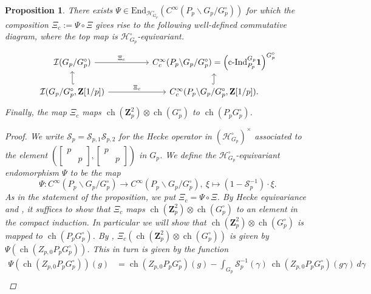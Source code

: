 \documentclass{amsart}%
\theoremstyle{plain}
\newtheorem{prop}[thm]{Proposition}
\theoremstyle{plain}
\theoremstyle{remark}
\DeclareMathOperator{\ch}{ch}
\begin{document}
\begin{prop}\label{prop mapping to compact induction}
    There exists $\Psi\in\mathrm{End}_{\mathcal{H}_{G_p}^\circ}\left(C^\infty(P_p\backslash G_p/G_p^\circ)\right)$ for which the composition $\Xi_c:=\Psi\circ \Xi$ gives rise to the following well-defined commutative diagram, where the top map is $\mathcal{H}_{G_p}^\circ$-equivariant.
    \[\begin{tikzcd}[ampersand replacement=\&,row sep=scriptsize]
	{\mathcal{I}(G_p/G_p^\circ)} \&\& {C_c^\infty(P_p\backslash G_p/G_p^\circ)=\left(\mathrm{c\text{-}Ind}_{P_p}^{G_p}\mathbf{1}\right)^{G_p^\circ}} \\
	{\mathcal{I}(G_p/G_p^\circ,\mathbf{Z}[1/p])} \&\& {C_c^\infty(P_p\backslash G_p/G_p^\circ,\mathbf{Z}[1/p]).}
	\arrow["{\Xi_c}", from=1-1, to=1-3]
	\arrow["{\Xi_c}", from=2-1, to=2-3]
	\arrow[hook', from=2-1, to=1-1]
	\arrow[hook, from=2-3, to=1-3]
\end{tikzcd}\]
Finally, the map $\Xi_c$ maps $\ch(\mathbf{Z}_p^2)\otimes \ch(G_p^\circ)$ to $\ch(P_pG_p^\circ)$.
\begin{proof}
    We write $\mathcal{S}_p=\mathcal{S}_{p,1}\mathcal{S}_{p,2}$ for the Hecke operator in $(\mathcal{H}_{G_p}^\circ)^\times$ associated to the element $\left(\left[\begin{smallmatrix}
        p & \\
        & p
    \end{smallmatrix}\right],\left[\begin{smallmatrix}
        p & \\
        & p
    \end{smallmatrix}\right]\right)$ in $G_p$. We define the $\mathcal{H}_{G_p}^\circ$-equivariant endomorphism $\Psi$ to be the map
    $$\Psi: C^\infty(P_p\backslash G_p/G_p^\circ)\rightarrow C^\infty(P_p\backslash G_p/G_p^\circ),\ \xi\mapsto (1-\mathcal{S}_p^{-1})\cdot\xi.$$
    As in the statement of the proposition, we put $\Xi_c=\Psi\circ \Xi$. By Hecke equivariance and , it suffices to show that $\Xi_c$ maps $\ch(\mathbf{Z}_p^2)\otimes \ch(G_p^\circ)$ to an element in the compact induction. In particular we will show that $\ch(\mathbf{Z}_p^2)\otimes \ch(G_p^\circ)$ is mapped to $\ch(P_pG_p^\circ)$. By , $\Xi_c\left(\ch(\mathbf{Z}_p^2)\otimes \ch(G_p^\circ)\right)$ is given by $\Psi\left(\ch(Z_{p,0}P_p G_p^\circ)\right)$. This in turn is given by the function
    \begin{align*}
        \Psi\left(\ch(Z_{p,0}P_p G_p^\circ)\right)(g)&=\ch(Z_{p,0}P_p G_p^\circ)(g)-\int_{G_p} \mathcal{S}_p^{-1}(\gamma)\ \ch(Z_{p,0}P_p G_p^\circ)(g\gamma)\ d\gamma\\

\end{align*}
\end{proof}
\end{prop}
\end{document}
